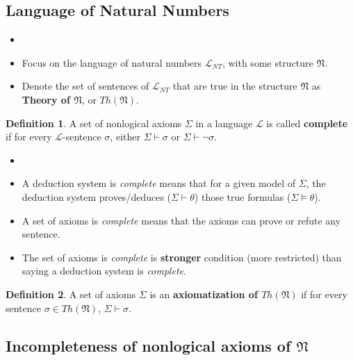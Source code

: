 \documentclass[11pt,letterpaper]{book}
\theoremstyle{definition}
\newtheorem{definition}{Definition}[section]
\begin{document}
\subsection{Language of Natural Numbers}

\begin{itemize}
\item[]
\item{Focus on the language of natural numbers $\mathcal{L}_{NT}$, with
some structure $\mathfrak{N}$.}
\item{Denote the set of sentences of $\mathcal{L}_{NT}$ that are true in
the structure $\mathfrak{N}$ as \textbf{Theory of $\mathfrak{N}$}, or
$Th(\mathfrak{N})$.}
\end{itemize}


\begin{definition}
A set of nonlogical axioms $\Sigma$ in a language $\mathcal{L}$ is
called \textbf{complete} if for every $\mathcal{L}$-sentence $\sigma$,
either $\Sigma \vdash \sigma$ or $\Sigma \vdash \lnot \sigma$.
\end{definition}


\begin{itemize}
\item[]
\item{A deduction system is \emph{complete} means that for a given model
of $\Sigma$, the deduction system proves/deduces ($\Sigma \vdash \theta$) those true formulas ($\Sigma \models \theta$).}
\item{A set of axioms is \emph{complete} means that the axioms can prove
or refute any sentence. }
\item{The set of axioms is \emph{complete} is \textbf{stronger} condition (more restricted) than saying a deduction system is \emph{complete}.}
\end{itemize}



\begin{definition}
A set of axioms $\Sigma$ is an \textbf{axiomatization of
$Th(\mathfrak{N})$} if for every sentence $\sigma \in Th(\mathfrak{N})$,
$\Sigma \vdash \sigma$.
\end{definition}


\subsection{Incompleteness of nonlogical axioms of $\mathfrak{N}$}
\end{document}
